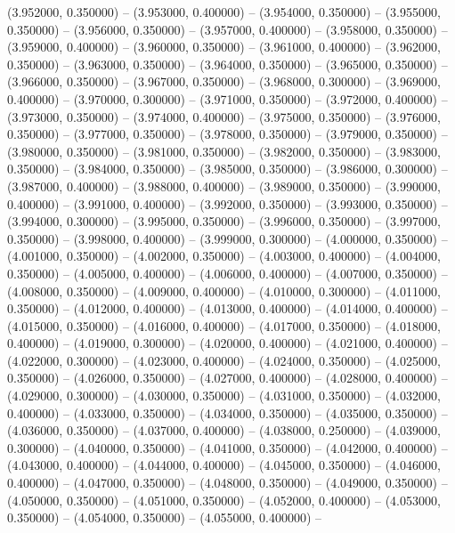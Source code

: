 (3.952000, 0.350000) -- 
(3.953000, 0.400000) -- 
(3.954000, 0.350000) -- 
(3.955000, 0.350000) -- 
(3.956000, 0.350000) -- 
(3.957000, 0.400000) -- 
(3.958000, 0.350000) -- 
(3.959000, 0.400000) -- 
(3.960000, 0.350000) -- 
(3.961000, 0.400000) -- 
(3.962000, 0.350000) -- 
(3.963000, 0.350000) -- 
(3.964000, 0.350000) -- 
(3.965000, 0.350000) -- 
(3.966000, 0.350000) -- 
(3.967000, 0.350000) -- 
(3.968000, 0.300000) -- 
(3.969000, 0.400000) -- 
(3.970000, 0.300000) -- 
(3.971000, 0.350000) -- 
(3.972000, 0.400000) -- 
(3.973000, 0.350000) -- 
(3.974000, 0.400000) -- 
(3.975000, 0.350000) -- 
(3.976000, 0.350000) -- 
(3.977000, 0.350000) -- 
(3.978000, 0.350000) -- 
(3.979000, 0.350000) -- 
(3.980000, 0.350000) -- 
(3.981000, 0.350000) -- 
(3.982000, 0.350000) -- 
(3.983000, 0.350000) -- 
(3.984000, 0.350000) -- 
(3.985000, 0.350000) -- 
(3.986000, 0.300000) -- 
(3.987000, 0.400000) -- 
(3.988000, 0.400000) -- 
(3.989000, 0.350000) -- 
(3.990000, 0.400000) -- 
(3.991000, 0.400000) -- 
(3.992000, 0.350000) -- 
(3.993000, 0.350000) -- 
(3.994000, 0.300000) -- 
(3.995000, 0.350000) -- 
(3.996000, 0.350000) -- 
(3.997000, 0.350000) -- 
(3.998000, 0.400000) -- 
(3.999000, 0.300000) -- 
(4.000000, 0.350000) -- 
(4.001000, 0.350000) -- 
(4.002000, 0.350000) -- 
(4.003000, 0.400000) -- 
(4.004000, 0.350000) -- 
(4.005000, 0.400000) -- 
(4.006000, 0.400000) -- 
(4.007000, 0.350000) -- 
(4.008000, 0.350000) -- 
(4.009000, 0.400000) -- 
(4.010000, 0.300000) -- 
(4.011000, 0.350000) -- 
(4.012000, 0.400000) -- 
(4.013000, 0.400000) -- 
(4.014000, 0.400000) -- 
(4.015000, 0.350000) -- 
(4.016000, 0.400000) -- 
(4.017000, 0.350000) -- 
(4.018000, 0.400000) -- 
(4.019000, 0.300000) -- 
(4.020000, 0.400000) -- 
(4.021000, 0.400000) -- 
(4.022000, 0.300000) -- 
(4.023000, 0.400000) -- 
(4.024000, 0.350000) -- 
(4.025000, 0.350000) -- 
(4.026000, 0.350000) -- 
(4.027000, 0.400000) -- 
(4.028000, 0.400000) -- 
(4.029000, 0.300000) -- 
(4.030000, 0.350000) -- 
(4.031000, 0.350000) -- 
(4.032000, 0.400000) -- 
(4.033000, 0.350000) -- 
(4.034000, 0.350000) -- 
(4.035000, 0.350000) -- 
(4.036000, 0.350000) -- 
(4.037000, 0.400000) -- 
(4.038000, 0.250000) -- 
(4.039000, 0.300000) -- 
(4.040000, 0.350000) -- 
(4.041000, 0.350000) -- 
(4.042000, 0.400000) -- 
(4.043000, 0.400000) -- 
(4.044000, 0.400000) -- 
(4.045000, 0.350000) -- 
(4.046000, 0.400000) -- 
(4.047000, 0.350000) -- 
(4.048000, 0.350000) -- 
(4.049000, 0.350000) -- 
(4.050000, 0.350000) -- 
(4.051000, 0.350000) -- 
(4.052000, 0.400000) -- 
(4.053000, 0.350000) -- 
(4.054000, 0.350000) -- 
(4.055000, 0.400000) -- 
